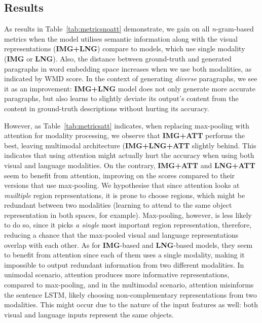 \documentclass[11pt,a4paper]{article}
\begin{document}
\subsection{Results}

As results in Table~\ref{tab:metricsnoatt} demonstrate, we gain on all \textit{n}-gram-based metrics when the model utilises semantic information along with the visual representations (\textbf{IMG+LNG}) compare to models, which use single modality (\textbf{IMG} or \textbf{LNG}).
Also, the distance between ground-truth and generated paragraphs in word embedding space increases when we use both modalities, as indicated by WMD score.
In the context of generating \textit{diverse} paragraphs, we see it as an improvement: \textbf{IMG+LNG} model does not only generate more accurate paragraphs, but also learns to slightly deviate its output's content from the content in ground-truth descriptions without hurting its accuracy.

However, as Table~\ref{tab:metricsatt} indicates, when replacing max-pooling with attention for modality processing, we observe that \textbf{IMG+ATT} performs the best, leaving multimodal architecture (\textbf{IMG+LNG+ATT} slightly behind.
This indicates that using attention might actually hurt the accuracy when using both visual and language modalities.
On the contrary, \textbf{IMG+ATT} and \textbf{LNG+ATT} seem to benefit from attention, improving on the scores compared to their versions that use max-pooling.
We hypothesise that since attention looks at \textit{muiltiple} region representations, it is prone to choose regions, which might be redundant between two modalities (learning to attend to the same object representation in both spaces, for example).
Max-pooling, however, is less likely to do so, since it picks \textit{a single} most important region representation, therefore, reducing a chance that the max-pooled visual and language representations overlap with each other.
As for \textbf{IMG}-based and \textbf{LNG}-based models, they seem to benefit from attention since each of them uses a single modality, making it impossible to output redundant information from two different modalities.
In unimodal scenario, attention produces more informative representations, compared to max-pooling, and in the multimodal scenario, attention misinforms the sentence LSTM, likely choosing non-complementary representations from two modalities.
This might occur due to the nature of the input features as well: both visual and language inputs represent the same objects.
\end{document}

